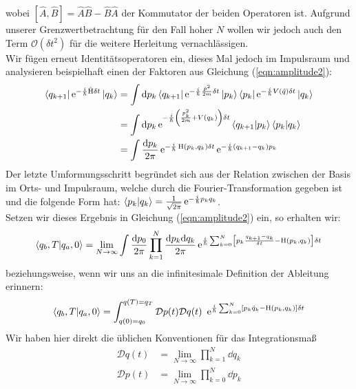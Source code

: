 wobei $[\hat{A},\hat{B}] = \hat{A}\hat{B} - \hat{B}\hat{A}$ der Kommutator der beiden Operatoren ist. Aufgrund unserer Grenzwertbetrachtung für den Fall hoher $N$ wollen wir jedoch auch den Term $\mathcal{O}(\delta t^2)$ für die weitere Herleitung vernachlässigen. \\
Wir fügen erneut Identitätsoperatoren ein, dieses Mal jedoch im Impulsraum und analysieren beispielhaft einen der Faktoren aus Gleichung (\ref{eqn:amplitude2}):
\begin{align}
	\bra{q_{k+1}}\operatorname{e}^{-\frac{i}{\hbar}\hat{\operatorname{H}}\delta t}\ket{q_k} &= \int \dd p_k \bra{q_{k+1}}\operatorname{e}^{-\frac{i}{\hbar}\frac{\hat{p}^2}{2m}\delta t}\ket{p_k}\bra{p_k}\operatorname{e}^{-\frac{i}{\hbar} V(\hat{q})\delta t}\ket{q_k} \nonumber \\
	&= \int \dd p_k \operatorname{e}^{-\frac{i}{\hbar}\left(\frac{p_k^2}{2m} +V(q_k)\right)\delta t}\bra{q_{k+1}}\ket{p_k}\bra{p_k}\ket{q_k} \nonumber \\
	&= \int \frac{\dd p_k}{2\pi} \operatorname{e}^{-\frac{i}{\hbar} \operatorname{H}(p_k,q_k)\delta t} \operatorname{e}^{-\frac{i}{\hbar}(q_{k+1}-q_k)p_k}
\end{align}
Der letzte Umformungsschritt begründet sich aus der Relation zwischen der Basis im Orts- und Impulsraum, welche durch die Fourier-Transformation gegeben ist und die folgende Form hat: $\braket{p_k}{q_k} = \frac{1}{\sqrt{2\pi}} \operatorname{e}^{-\frac{i}{\hbar} p_kq_k}$. \\
Setzen wir dieses Ergebnis in Gleichung (\ref{eqn:amplitude2}) ein, so erhalten wir: 
\begin{align}
	\braket{q_b,T}{q_a,0} = \lim_{N\rightarrow\infty} \int \frac{\dd p_0}{2\pi} \prod_{k=1}^N \frac{\dd p_k\dd q_k}{2\pi} \operatorname{e}^{\frac{i}{\hbar}\sum_{k=0}^N\left[p_k\frac{q_{k+1}-q_k}{\delta t} - \operatorname{H}(p_k,q_k)\right]\delta t}
\end{align}
beziehungsweise, wenn wir uns an die infinitesimale Definition der Ableitung erinnern:
\begin{align}
	\braket{q_b,T}{q_a,0} = \int_{q(0)=q_0}^{q(T)=q_T} \mathcal{D}p(t)\mathcal{D}q(t) \ \operatorname{e}^{\ihbar\sum_{k=0}^N\left[p_k\dot{q}_k - \operatorname{H}(p_k,q_k)\right]\delta t}
\end{align}
Wir haben hier direkt die üblichen Konventionen für das Integrationsmaß
\begin{align*}
	\mathcal{D}q(t) &= \lim_{N\rightarrow\infty} \prod_{k=1}^{N} \dd q_k \\
	\mathcal{D}p(t) &= \lim_{N\rightarrow\infty} \prod_{k=0}^{N} \dd p_k
\end{align*}
